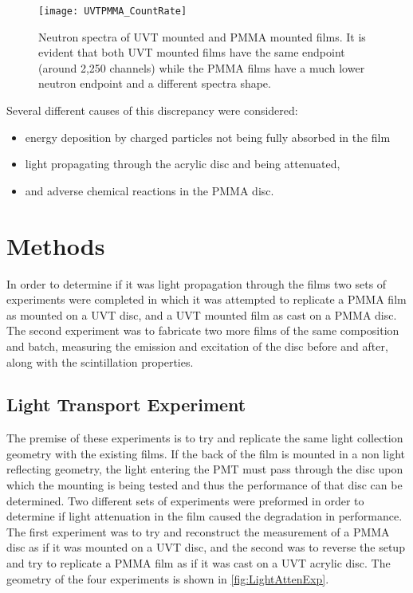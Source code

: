 \documentclass[draftcls,onecolumn]{IEEEtran}
\begin{document}
\begin{figure}
  \centering
  \texttt{[image: UVTPMMA\_CountRate]}
  \caption[Neutron Spectra of UVT mounted and PMMA mounted films]{Neutron spectra of UVT mounted and PMMA mounted films.  It is evident that both UVT mounted films have the same endpoint (around 2,250 channels) while the PMMA films have a much lower neutron endpoint and a different spectra shape.}
  \label{fig:NeutronCountRateRepeat}
\end{figure}
Several different causes of this discrepancy were considered:
\begin{itemize}
  \item energy deposition by charged particles not being fully absorbed in the film 
  \item light propagating through the acrylic disc and being attenuated,
  \item and adverse chemical reactions in the PMMA disc.
\end{itemize}

\section{Methods}
In order to determine if it was light propagation through the films two sets of experiments were completed in which it was attempted to replicate a PMMA film as mounted on a UVT disc, and a UVT mounted film as cast on a PMMA disc.
The second experiment was to fabricate two more films of the same composition and batch, measuring the emission and excitation of the disc before and after, along with the scintillation properties.

\subsection{Light Transport Experiment}
The premise of these experiments is to try and replicate the same light collection geometry with the existing films.
If the back of the film is mounted in a non light reflecting geometry, the light entering the PMT must pass through the disc upon which the mounting is being tested and thus the performance of that disc can be determined.
Two different sets of experiments were preformed in order to determine if light attenuation in the film caused the degradation in performance.
The first experiment was to try and reconstruct the measurement of a PMMA disc as if it was mounted on a UVT disc, and the second was to reverse the setup and try to replicate a PMMA film as if it was cast on a UVT acrylic disc.
The geometry of the four experiments is shown in \autoref{fig:LightAttenExp}.
\end{document}
